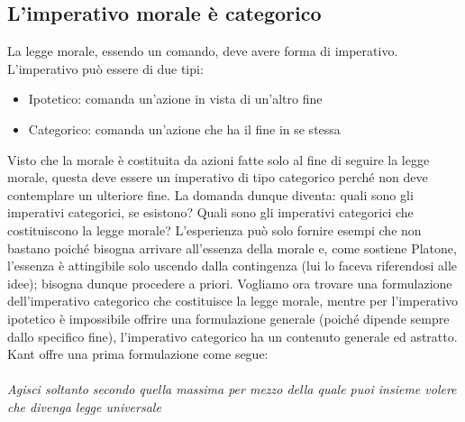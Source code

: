 \documentclass[10pt,a4paper]{article}
\begin{document}
\subsection{L'imperativo morale è categorico}
La legge morale, essendo un comando, deve avere forma di imperativo. L'imperativo può essere di due tipi: 
\begin{itemize}
	\item Ipotetico: comanda un'azione in vista di un'altro fine
	\item Categorico: comanda un'azione che ha il fine in se stessa
\end{itemize}
Visto che la morale è costituita da azioni fatte solo al fine di seguire la legge morale, questa deve essere un imperativo di tipo categorico perché non deve contemplare un ulteriore fine. La domanda dunque diventa: quali sono gli imperativi categorici, se esistono? Quali sono gli imperativi categorici che costituiscono la legge morale? L'esperienza può solo fornire esempi che non bastano poiché bisogna arrivare all'essenza della morale e, come sostiene Platone, l'essenza è attingibile solo uscendo dalla contingenza (lui lo faceva riferendosi alle idee); bisogna dunque procedere a priori. Vogliamo ora trovare una formulazione dell'imperativo categorico che costituisce la legge morale, mentre per l'imperativo ipotetico è impossibile offrire una formulazione generale (poiché dipende sempre dallo specifico fine), l'imperativo categorico ha un contenuto generale ed astratto. Kant offre una prima formulazione come segue: \\\\
\textit{Agisci soltanto secondo quella massima per mezzo della quale puoi insieme volere che divenga legge universale}\\\\
\end{document}
